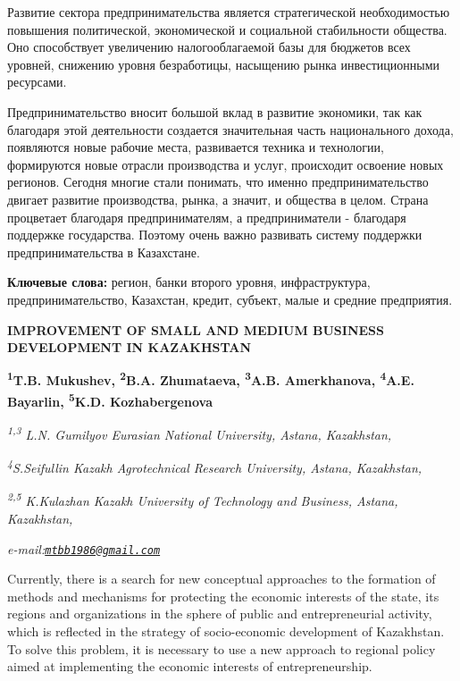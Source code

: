Развитие сектора предпринимательства является стратегической
необходимостью повышения политической, экономической и социальной
стабильности общества. Оно способствует увеличению налогооблагаемой базы
для бюджетов всех уровней, снижению уровня безработицы, насыщению рынка
инвестиционными ресурсами.

Предпринимательство вносит большой вклад в развитие экономики, так как
благодаря этой деятельности создается значительная часть национального
дохода, появляются новые рабочие места, развивается техника и
технологии, формируются новые отрасли производства и услуг, происходит
освоение новых регионов. Сегодня многие стали понимать, что именно
предпринимательство двигает развитие производства, рынка, а значит, и
общества в целом. Страна процветает благодаря предпринимателям, а
предприниматели - благодаря поддержке государства. Поэтому очень важно
развивать систему поддержки предпринимательства в Казахстане.

{\bfseries Ключевые слова:} регион, банки второго уровня, инфраструктура,
предпринимательство, Казахстан, кредит, субъект, малые и средние
предприятия.

\vspace{1em}

{\bfseries IMPROVEMENT OF SMALL AND MEDIUM BUSINESS DEVELOPMENT IN KAZAKHSTAN}

\begin{articleheader}
{\bfseries
\textsuperscript{1}T.B. Mukushev\textsuperscript{\envelope },
\textsuperscript{2}B.A. Zhumataeva,
\textsuperscript{3}A.B. Amerkhanova,
\textsuperscript{4}A.E. Bayarlin,
\textsuperscript{5}K.D. Kozhabergenova}
\end{articleheader}

\begin{affiliation}
\emph{\textsuperscript{1,3} L.N. Gumilyov Eurasian National University, Astana, Kazakhstan,}

\emph{\textsuperscript{4}S.Seifullin Kazakh Agrotechnical Research University, Astana, Kazakhstan,}

\emph{\textsuperscript{2,5} K.Kulazhan Kazakh University of Technology and Business, Astana, Kazakhstan,}

\emph{e-mail:\href{mailto:mtbb1986@gmail.com}{\nolinkurl{mtbb1986@gmail.com}}}
\end{affiliation}

Currently, there is a search for new conceptual approaches to the
formation of methods and mechanisms for protecting the economic
interests of the state, its regions and organizations in the sphere of
public and entrepreneurial activity, which is reflected in the strategy
of socio-economic development of Kazakhstan. To solve this problem, it
is necessary to use a new approach to regional policy aimed at
implementing the economic interests of entrepreneurship.


